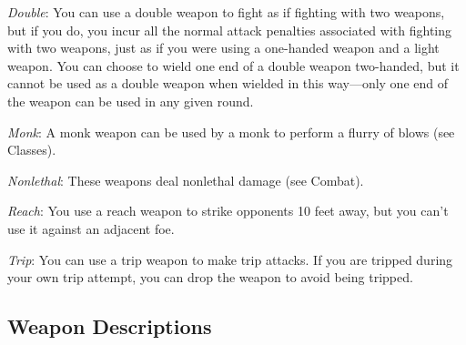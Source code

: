 \textit{Double}: You can use a double weapon to fight as if fighting with two weapons, but if you do, you incur all the normal attack penalties associated with fighting with two weapons, just as if you were using a one-handed weapon and a light weapon. You can choose to wield one end of a double weapon two-handed, but it cannot be used as a double weapon when wielded in this way---only one end of the weapon can be used in any given round.
		
\textit{Monk}: A monk weapon can be used by a monk to perform a flurry of blows (see Classes).
		
\textit{Nonlethal}: These weapons deal nonlethal damage (see Combat).
		
\textit{Reach}: You use a reach weapon to strike opponents 10 feet away, but you can't use it against an adjacent foe.
		
\textit{Trip}: You can use a trip weapon to make trip attacks. If you are tripped during your own trip attempt, you can drop the weapon to avoid being tripped.
	
\subsection{Weapon Descriptions}

